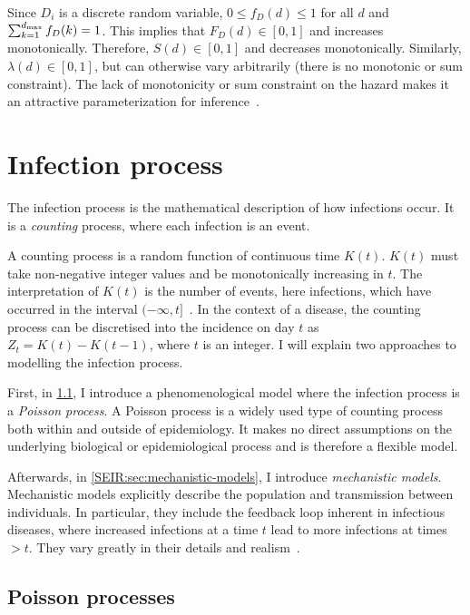 \documentclass[thesis.tex]{subfiles}
\begin{document}
Since $D_i$ is a discrete random variable, $0 \leq f_D(d) \leq 1$ for all $d$ and $\sum_{k=1}^{d_\text{max}} f_D(k) = 1$.
This implies that $F_D(d) \in [0, 1]$ and increases monotonically.
Therefore, $S(d) \in [0, 1]$ and decreases monotonically.
Similarly, $\lambda(d) \in [0,1]$, but can otherwise vary arbitrarily (\ie there is no monotonic or sum constraint).
The lack of monotonicity or sum constraint on the hazard makes it an attractive parameterization for inference~\autocite{heBayesian}.

\section{Infection process} \label{inc-prev:sec:infection-process}
The infection process is the mathematical description of how infections occur.
It is a \emph{counting} process, where each infection is an event.

A counting process is a random function of continuous time $K(t)$.
$K(t)$ must take non-negative integer values and be monotonically increasing in $t$.
The interpretation of $K(t)$ is the number of events, here infections, which have occurred in the interval $(-\infty, t]$~\autocite[244]{yanDistribution}.
In the context of a disease, the counting process can be discretised into the incidence on day $t$ as $Z_t = K(t) - K(t-1)$, where $t$ is an integer.
I will explain two approaches to modelling the infection process.

First, in \cref{inc-prev:sec:poisson-process}, I introduce a phenomenological model where the infection process is a \emph{Poisson process}.
A Poisson process is a widely used type of counting process both within and outside of epidemiology.
It makes no direct assumptions on the underlying biological or epidemiological process and is therefore a flexible model.

Afterwards, in \cref{SEIR:sec:mechanistic-models}, I introduce \emph{mechanistic models}.
Mechanistic models explicitly describe the population and transmission between individuals.
In particular, they include the feedback loop inherent in infectious diseases, where increased infections at a time $t$ lead to more infections at times $> t$.
They vary greatly in their details and realism~\autocite{murilloMultiscale}.

\subsection{Poisson processes} \label{inc-prev:sec:poisson-process}
\end{document}
